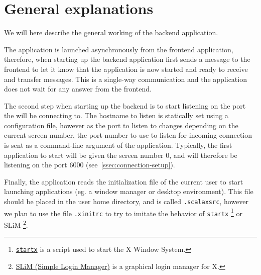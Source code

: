 \section{General explanations}
%
We will here describe the general working of the backend application.

The application is launched asynchronously from the frontend application, 
therefore, when starting up the backend application first sends a message to 
the frontend to let it know that the application is now started and ready to 
receive and transfer messages. This is a single-way communication and the 
application does not wait for any answer from the frontend.

The second step when starting up the backend is to start listening on the 
port the  will be connecting to. The hostname 
to listen is statically set using a configuration file, however as the port 
to listen to changes depending on the current screen number, the port number to 
use to listen for incoming connection is sent as a command-line argument of the 
application. Typically, the first application to start will be given the 
screen number $0$, and will therefore be listening on the port $6000$ 
(see~\ref{ssec:connection-setup}).

Finally, the application reads the initialization file of the current user 
to start launching applications (eg. a window manager or desktop environment). 
This file should be placed in the user home directory, and is called 
\lstinline{.scalaxsrc}, however we plan to use the file \lstinline{.xinitrc} to 
try to imitate the behavior of \lstinline{startx}
\footnote{\href{http://linux.die.net/man/1/startx}{\lstinline{startx}} is a script used to start the X Window System.}
or SLiM
\footnote{\href{http://slim.berlios.de/}{SLiM (Simple Login Manager)} is a graphical login manager for X.}.


